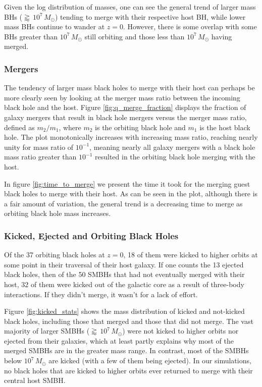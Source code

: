 \documentclass[english, apj]{emulateapj}
\begin{document}
Given the log distribution of masses, one can see the general trend of larger mass BHs ($\gtrapprox\, 10^7\, M_{\odot}$) tending to merge with their respective host BH, while lower mass BHs continue to wander at $z=0$.  However, there is some overlap with some BHs greater than $10^7\, M_{\odot}$ still orbiting and those less than $10^7\, M_{\odot}$ having merged.

\subsubsection{Mergers}\label{sec:mergers}
The tendency of larger mass black holes to merge with their host can perhaps be more clearly seen by looking at the merger mass ratio between the incoming black hole and the host.  Figure \ref{fig:q_merge_fraction} displays the fraction of galaxy mergers that result in black hole mergers versus the merger mass ratio, defined as $m_2/m_1$, where $m_2$ is the orbiting black hole and $m_1$ is the host black hole.  The plot monotonically increases with increasing mass ratio, reaching nearly unity for mass ratio of $10^{-1}$, meaning nearly all galaxy mergers with a black hole mass ratio greater than $10^{-1}$ resulted in the orbiting black hole merging with the host.

In figure \ref{fig:time_to_merge} we present the time it took for the merging guest black holes to merge with their host.  As can be seen in the plot, although there is a fair amount of variation, the general trend is a decreasing time to merge as orbiting black hole mass increases.

\subsubsection{Kicked, Ejected and Orbiting Black Holes}\label{sec:kicked_orbiting}
Of the 37 orbiting black holes at $z=0$, 18 of them were kicked to higher orbits at some point in their traversal of their host galaxy.  If one counts the 13 ejected black holes, then of the 50 SMBHs that had not eventually merged with their host, 32 of them were kicked out of the galactic core as a result of three-body interactions.  If they didn't merge, it wasn't for a lack of effort.

Figure \ref{fig:kicked_stats} shows the mass distribution of kicked and not-kicked black holes, including those that merged and those that did not merge.  The vast majority of larger SMBHs ($\gtrapprox\, 10^7\, M_{\odot}$) were not kicked to higher orbits nor ejected from their galaxies, which at least partly explains why most of the merged SMBHs are in the greater mass range.  In contrast, most of the SMBHs below $10^7\, M_{\odot}$ are kicked (with a few of them being ejected).  In our simulations, no black holes that are kicked to higher orbits ever returned to merge with their central host SMBH.
\end{document}
